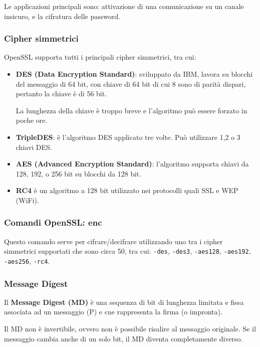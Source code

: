             Le applicazioni principali sono: attivazione di una comunicazione su un canale insicuro, e la cifratura delle password.

        \subsubsection{Cipher simmetrici}
            OpenSSL supporta tutti i principali cipher simmetrici, tra cui:
            \begin{itemize}
                \item \textbf{DES (Data Encryption Standard)}: sviluppato da IBM, lavora su blocchi del messaggio di 64 bit, con chiave di 64 bit di cui 8 sono di parità dispari, pertanto la chiave è di 56 bit.
                
                La lunghezza della chiave è troppo breve e l'algoritmo può essere forzato in poche ore.
                \item \textbf{TripleDES}: è l'algoritmo DES applicato tre volte. Può utilizzare 1,2 o 3 chiavi DES.
                \item \textbf{AES (Advanced Encryption Standard)}: l'algoritmo supporta chiavi da 128, 192, o 256 bit su blocchi da 128 bit.
                \item \textbf{RC4} è un algoritmo a 128 bit utilizzato nei protocolli quali SSL e WEP (WiFi).
            \end{itemize}

        \subsubsection{Comandi OpenSSL: enc}
            Questo comando serve per cifrare/decifrare utilizzando uno tra i cipher simmetrici supportati che sono circa 50, tra cui: \verb|-des|, \verb|-des3|, \verb|-aes128|, \verb|-aes192|, \verb|-aes256|, \verb|-rc4|.

            

        \subsubsection{Message Digest}
            Il \textbf{Message Digest (MD)} è una sequenza di bit di lunghezza limitata e fissa associata ad un messaggio (P) e cne rappresenta la firma (o impronta).
        
            Il MD non è invertibile, ovvero non è possibile risalire al messaggio originale. Se il messaggio cambia anche di un solo bit, il MD diventa completamente diverso.
        
